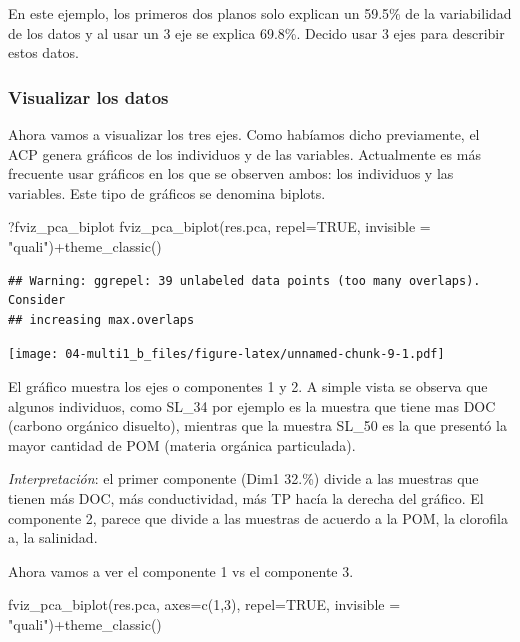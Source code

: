 \documentclass[
]{book}
\newenvironment{Shaded}{\begin{snugshade}}{\end{snugshade}}
\newcommand{\AttributeTok}[1]{\textcolor[rgb]{0.77,0.63,0.00}{#1}}
\newcommand{\ConstantTok}[1]{\textcolor[rgb]{0.00,0.00,0.00}{#1}}
\newcommand{\DecValTok}[1]{\textcolor[rgb]{0.00,0.00,0.81}{#1}}
\newcommand{\FunctionTok}[1]{\textcolor[rgb]{0.00,0.00,0.00}{#1}}
\newcommand{\NormalTok}[1]{#1}
\newcommand{\SpecialCharTok}[1]{\textcolor[rgb]{0.00,0.00,0.00}{#1}}
\newcommand{\StringTok}[1]{\textcolor[rgb]{0.31,0.60,0.02}{#1}}
\begin{document}
En este ejemplo, los primeros dos planos solo explican un 59.5\% de la variabilidad de los datos y al usar un 3 eje se explica 69.8\%. Decido usar 3 ejes para describir estos datos.

\hypertarget{visualizar-los-datos}{%
\subsubsection{Visualizar los datos}\label{visualizar-los-datos}}

Ahora vamos a visualizar los tres ejes. Como habíamos dicho previamente, el ACP genera gráficos de los individuos y de las variables. Actualmente es más frecuente usar gráficos en los que se observen ambos: los individuos y las variables. Este tipo de gráficos se denomina biplots.

\begin{Shaded}
\begin{Highlighting}[]
\NormalTok{?fviz\_pca\_biplot}
\FunctionTok{fviz\_pca\_biplot}\NormalTok{(res.pca,  }\AttributeTok{repel=}\ConstantTok{TRUE}\NormalTok{, }\AttributeTok{invisible =} \StringTok{"quali"}\NormalTok{)}\SpecialCharTok{+}\FunctionTok{theme\_classic}\NormalTok{()}
\end{Highlighting}
\end{Shaded}

\begin{verbatim}
## Warning: ggrepel: 39 unlabeled data points (too many overlaps). Consider
## increasing max.overlaps
\end{verbatim}

\texttt{[image: 04-multi1\_b\_files/figure-latex/unnamed-chunk-9-1.pdf]}

El gráfico muestra los ejes o componentes 1 y 2. A simple vista se observa que algunos individuos, como SL\_34 por ejemplo es la muestra que tiene mas DOC (carbono orgánico disuelto), mientras que la muestra SL\_50 es la que presentó la mayor cantidad de POM (materia orgánica particulada).

\emph{Interpretación}: el primer componente (Dim1 32.\%) divide a las muestras que tienen más DOC, más conductividad, más TP hacía la derecha del gráfico. El componente 2, parece que divide a las muestras de acuerdo a la POM, la clorofila a, la salinidad.

Ahora vamos a ver el componente 1 vs el componente 3.

\begin{Shaded}
\begin{Highlighting}[]
\FunctionTok{fviz\_pca\_biplot}\NormalTok{(res.pca, }\AttributeTok{axes=}\FunctionTok{c}\NormalTok{(}\DecValTok{1}\NormalTok{,}\DecValTok{3}\NormalTok{),  }\AttributeTok{repel=}\ConstantTok{TRUE}\NormalTok{, }\AttributeTok{invisible =} \StringTok{"quali"}\NormalTok{)}\SpecialCharTok{+}\FunctionTok{theme\_classic}\NormalTok{()}
\end{Highlighting}
\end{Shaded}
\end{document}
